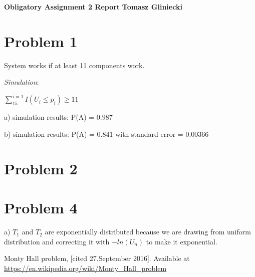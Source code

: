 \documentclass[a4paper, 11pt]{article}
\begin{document}
\noindent
\large\textbf{Obligatory Assignment 2 Report} \hfill \textbf{Tomasz Gliniecki} \\


\section*{Problem 1}
System works if at least 11 components work.

\emph{Simulation}:\\
\centerline{$ \sum_{15}^{i=1} I (U_i \leq p_i) \geq 11 $}

a)
simulation results: P(A) = $ 0.987 $

b)
simulation results: P(A) = $0.841$ with standard error = $0.00366$


\section*{Problem 2}


\section*{Problem 4}

a) $T_1$  and $T_2$ are exponentially distributed because we are drawing from uniform distribution and correcting it with $-ln(U_n)$ to make it exponential.

  
\begin{thebibliography}{9}
  
  Monty Hall problem, [cited 27.September 2016]. Available at \url{https://en.wikipedia.org/wiki/Monty_Hall_problem}

\end{thebibliography}
\end{document}
